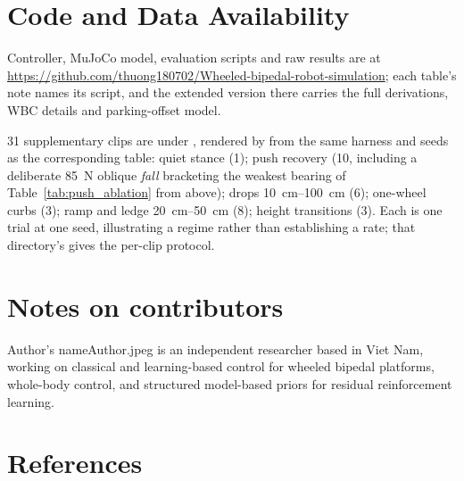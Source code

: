 \documentclass{jcd}
\begin{document}
\section*{Code and Data Availability}
Controller, MuJoCo model, evaluation scripts and raw results are at
\url{https://github.com/thuong180702/Wheeled-bipedal-robot-simulation}; each
table's note names its script, and the extended version there carries the full
derivations, WBC details and parking-offset model.

\num{31} supplementary clips are under , rendered by
 from the same harness and seeds as the
corresponding table: quiet stance (1); push recovery (10, including a deliberate
\SI{85}{N} oblique \emph{fall} bracketing the weakest bearing of
Table~\ref{tab:push_ablation} from above); drops \SIrange{10}{100}{cm} (6);
one-wheel curbs (3); ramp and ledge \SIrange{20}{50}{cm} (8); height
transitions (3). Each is one trial at one seed, illustrating a regime rather
than establishing a rate; that directory's  gives the per-clip
protocol.


\section{Notes on contributors}

\vspace{-2mm}

\begin{contributor}[height=24mm]{Author's name}{Author.jpeg}%
is an independent researcher based in Viet Nam, working on classical and
learning-based control for wheeled bipedal platforms, whole-body control, and
structured model-based priors for residual reinforcement learning.
\end{contributor}

\backmatter

\section{References}


\vfil
\balance
\end{document}
